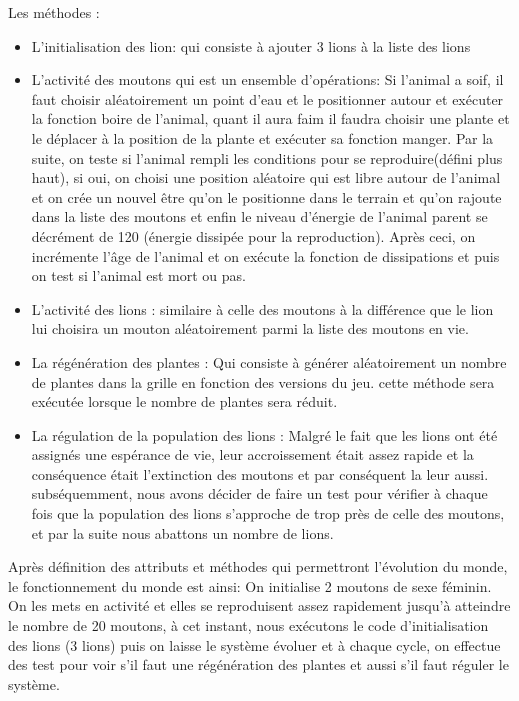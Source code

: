 \documentclass[a4paper,12pt]{article} %
\begin{document}
Les méthodes :
\begin{itemize}
    \item L'initialisation des lion: qui consiste à ajouter 3 lions à la liste des lions
    \item L'activité des moutons qui est un ensemble d'opérations: Si l'animal a soif, il faut choisir aléatoirement un point d'eau et le positionner autour et exécuter la fonction boire de l'animal, quant il aura faim il faudra choisir une plante et le déplacer à la position de la plante et exécuter sa fonction manger. Par la suite, on teste si l'animal rempli les conditions pour se reproduire(défini plus haut), si oui, on choisi une position aléatoire qui est libre autour de l'animal et on crée un nouvel être qu'on le positionne dans le terrain et qu'on rajoute dans la liste des moutons et enfin le niveau d'énergie de l'animal parent se décrément de 120 (énergie dissipée pour la reproduction). Après ceci, on incrémente l'âge de l'animal et on exécute la fonction de dissipations et puis on test si l'animal est mort ou pas.
    \item L'activité des lions : similaire à celle des moutons à la différence que le lion lui choisira un mouton aléatoirement parmi la liste des moutons en vie.
    \item La régénération des plantes : Qui consiste à générer aléatoirement un nombre de plantes dans la grille en fonction des versions du jeu. cette méthode sera exécutée lorsque le nombre de plantes sera réduit.
    \item La régulation de la population des lions : Malgré le fait que les lions ont été assignés une espérance de vie, leur accroissement était assez rapide et la conséquence était l'extinction des moutons et par conséquent la leur aussi. subséquemment, nous avons décider de faire un test pour vérifier à chaque fois que la population des lions s'approche de trop près de celle des moutons, et par la suite nous abattons un nombre de lions.
\end{itemize}

Après définition des attributs et méthodes qui permettront l'évolution du monde, le fonctionnement du monde est ainsi: On initialise 2 moutons de sexe féminin. On les mets en activité et elles se reproduisent assez rapidement jusqu'à atteindre le nombre de 20 moutons, à cet instant, nous exécutons le code d'initialisation des lions (3 lions) puis on laisse le système évoluer et à chaque cycle, on effectue des test pour voir s'il faut une régénération des plantes et aussi s'il faut réguler le système.
\end{document}
